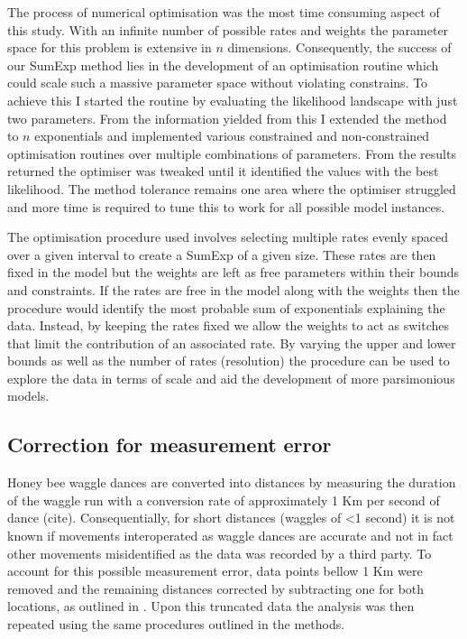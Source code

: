 \documentclass[11pt,usenames,dvipsnames,a4paper]{article}
\begin{document}
The process of numerical optimisation was the most time consuming aspect of this study. With an infinite number of possible rates and weights the parameter space for this problem is extensive in $n$ dimensions. Consequently, the success of our SumExp method lies in the development of an optimisation routine which could scale such a massive parameter space without violating constrains. To achieve this I started the routine by evaluating the likelihood landscape with just two parameters. From the information yielded from this I extended the method to $n$ exponentials and implemented various constrained and non-constrained optimisation routines  over multiple combinations of parameters. From the results returned the optimiser was tweaked until it identified the values with the best likelihood. The method tolerance remains one area where the optimiser struggled and more time is required to tune this to work for all possible model instances.

\begin{linenumbers}
The optimisation procedure used involves selecting multiple rates evenly spaced over a given interval to create a SumExp of a given size. These rates are then fixed in the model but the weights are left as free parameters within their bounds and constraints. If the rates are free in the model along with the weights then the procedure would identify the most probable sum of exponentials explaining the data. Instead, by keeping the rates fixed we allow the weights to act as switches that limit the contribution of an associated rate. By varying the upper and lower bounds as well as the number of rates (resolution) the procedure can be used to explore the data in terms of scale and aid the development of more parsimonious models. 
\end{linenumbers}

\subsection{Correction for measurement error}

\begin{linenumbers}
\hspace{\parindent}
Honey bee waggle dances are converted into distances by measuring the duration of the waggle run with a conversion rate of approximately 1 Km per second of dance (cite). Consequentially, for short distances (waggles of \textless 1 second) it is not known if movements interoperated as waggle dances are accurate and not in fact other movements misidentified as the data was recorded by a third party. To account for this possible measurement error, data points bellow 1 Km were removed and the remaining distances corrected by subtracting one for both locations, as outlined in \cite{Petrovskii2011}. Upon this truncated data the analysis was then repeated using the same procedures outlined in the methods.
\end{linenumbers}
\end{document}
